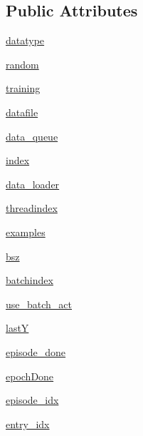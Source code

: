 \subsection*{Public Attributes}
\begin{DoxyCompactItemize}
\item 
\hyperlink{classparlai_1_1core_1_1teachers_1_1FixedDialogTeacher_a65c9039b783299ad6033ccbb995ca493}{datatype}
\item 
\hyperlink{classparlai_1_1core_1_1teachers_1_1FixedDialogTeacher_a7e5054e18ce919c0eb04188c801ddef1}{random}
\item 
\hyperlink{classparlai_1_1core_1_1teachers_1_1FixedDialogTeacher_af64b55521fe587c17696b0b805a2b0d4}{training}
\item 
\hyperlink{classparlai_1_1core_1_1teachers_1_1FixedDialogTeacher_a822d9f5c86ab0b0c608ae26901d3dec3}{datafile}
\item 
\hyperlink{classparlai_1_1core_1_1teachers_1_1FixedDialogTeacher_a59d9cf6a9e7f64a5d9a8d180ed06c001}{data\+\_\+queue}
\item 
\hyperlink{classparlai_1_1core_1_1teachers_1_1FixedDialogTeacher_a73ac86c06c926ab7aedd73d49e3bb2b5}{index}
\item 
\hyperlink{classparlai_1_1core_1_1teachers_1_1FixedDialogTeacher_a7edc6520195726382082a76486fa3747}{data\+\_\+loader}
\item 
\hyperlink{classparlai_1_1core_1_1teachers_1_1FixedDialogTeacher_a4443c43dc20f8f817c8cf28e2d795d6d}{threadindex}
\item 
\hyperlink{classparlai_1_1core_1_1teachers_1_1FixedDialogTeacher_a95eb8aeb051fc81a10ac7e1a7d5fed3d}{examples}
\item 
\hyperlink{classparlai_1_1core_1_1teachers_1_1FixedDialogTeacher_a2f6069ff207d360edf2729c245ceaa0f}{bsz}
\item 
\hyperlink{classparlai_1_1core_1_1teachers_1_1FixedDialogTeacher_a468d55710137a42b18f85212d7068c47}{batchindex}
\item 
\hyperlink{classparlai_1_1core_1_1teachers_1_1FixedDialogTeacher_a8a551d24fa77a0eb880cbee90b507f7e}{use\+\_\+batch\+\_\+act}
\item 
\hyperlink{classparlai_1_1core_1_1teachers_1_1FixedDialogTeacher_abf7e9a8868478220ca4df71dadeed4a9}{lastY}
\item 
\hyperlink{classparlai_1_1core_1_1teachers_1_1FixedDialogTeacher_a86428affae9471df880dd5e8dc4b90ed}{episode\+\_\+done}
\item 
\hyperlink{classparlai_1_1core_1_1teachers_1_1FixedDialogTeacher_a2fec0a004a2ea81402a66244c62b8607}{epoch\+Done}
\item 
\hyperlink{classparlai_1_1core_1_1teachers_1_1FixedDialogTeacher_afd4ebab8063eb42d182d30a1a41f133e}{episode\+\_\+idx}
\item 
\hyperlink{classparlai_1_1core_1_1teachers_1_1FixedDialogTeacher_ae3201b15f3c3b46a2f3511bad9b43e7d}{entry\+\_\+idx}
\end{DoxyCompactItemize}


